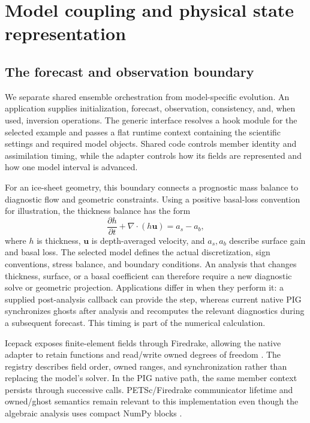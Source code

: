 \documentclass[11pt,a4paper]{article}
\begin{document}
\section{Model coupling and physical state representation}
\subsection{The forecast and observation boundary}
We separate shared ensemble orchestration from model-specific evolution. An application supplies initialization, forecast, observation, consistency, and, when used, inversion operations. The generic interface resolves a hook module for the selected example and passes a flat runtime context containing the scientific settings and required model objects. Shared code controls member identity and assimilation timing, while the adapter controls how its fields are represented and how one model interval is advanced.

For an ice-sheet geometry, this boundary connects a prognostic mass balance to diagnostic flow and geometric constraints. Using a positive basal-loss convention for illustration, the thickness balance has the form
\begin{equation}
 \frac{\partial h}{\partial t}+\nabla\!\cdot(h\mathbf u)=a_s-a_b,
 \label{eq:continuity}
\end{equation}
where \(h\) is thickness, \(\mathbf u\) is depth-averaged velocity, and \(a_s,a_b\) describe surface gain and basal loss. The selected model defines the actual discretization, sign conventions, stress balance, and boundary conditions. An analysis that changes thickness, surface, or a basal coefficient can therefore require a new diagnostic solve or geometric projection. Applications differ in when they perform it: a supplied post-analysis callback can provide the step, whereas current native PIG synchronizes ghosts after analysis and recomputes the relevant diagnostics during a subsequent forecast. This timing is part of the numerical calculation.

Icepack exposes finite-element fields through Firedrake, allowing the native adapter to retain functions and read/write owned degrees of freedom \citep{shapero2021,rathgeber2016}. The registry describes field order, owned ranges, and synchronization rather than replacing the model's solver. In the PIG native path, the same member context persists through successive calls. PETSc/Firedrake communicator lifetime and owned/ghost semantics remain relevant to this implementation even though the algebraic analysis uses compact NumPy blocks \citep{petsc2025}.
\end{document}
